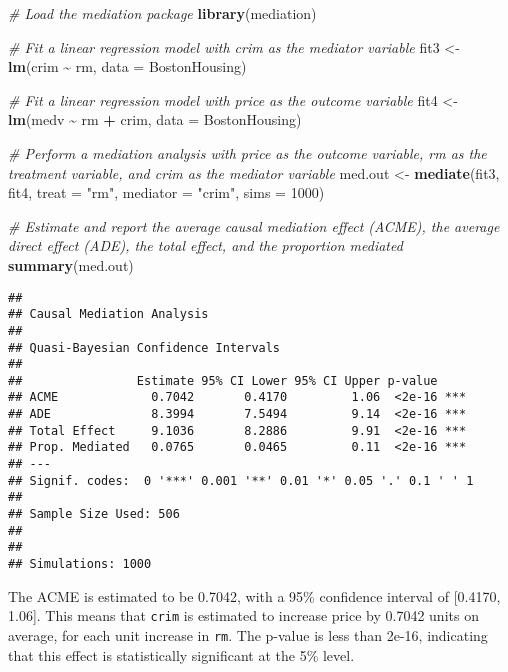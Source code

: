 \documentclass[
]{book}
\newenvironment{Shaded}{\begin{snugshade}}{\end{snugshade}}
\newcommand{\AttributeTok}[1]{\textcolor[rgb]{0.13,0.29,0.53}{#1}}
\newcommand{\CommentTok}[1]{\textcolor[rgb]{0.56,0.35,0.01}{\textit{#1}}}
\newcommand{\DecValTok}[1]{\textcolor[rgb]{0.00,0.00,0.81}{#1}}
\newcommand{\FunctionTok}[1]{\textcolor[rgb]{0.13,0.29,0.53}{\textbf{#1}}}
\newcommand{\NormalTok}[1]{#1}
\newcommand{\OtherTok}[1]{\textcolor[rgb]{0.56,0.35,0.01}{#1}}
\newcommand{\SpecialCharTok}[1]{\textcolor[rgb]{0.81,0.36,0.00}{\textbf{#1}}}
\newcommand{\StringTok}[1]{\textcolor[rgb]{0.31,0.60,0.02}{#1}}
\begin{document}
\begin{Shaded}
\begin{Highlighting}[]
\CommentTok{\# Load the mediation package}
\FunctionTok{library}\NormalTok{(mediation)}

\CommentTok{\# Fit a linear regression model with crim as the mediator variable}
\NormalTok{fit3 }\OtherTok{\textless{}{-}} \FunctionTok{lm}\NormalTok{(crim }\SpecialCharTok{\textasciitilde{}}\NormalTok{ rm, }\AttributeTok{data =}\NormalTok{ BostonHousing)}

\CommentTok{\# Fit a linear regression model with price as the outcome variable}
\NormalTok{fit4 }\OtherTok{\textless{}{-}} \FunctionTok{lm}\NormalTok{(medv }\SpecialCharTok{\textasciitilde{}}\NormalTok{ rm }\SpecialCharTok{+}\NormalTok{ crim, }\AttributeTok{data =}\NormalTok{ BostonHousing)}

\CommentTok{\# Perform a mediation analysis with price as the outcome variable, rm as the treatment variable, and crim as the mediator variable}
\NormalTok{med.out }\OtherTok{\textless{}{-}} \FunctionTok{mediate}\NormalTok{(fit3, fit4, }\AttributeTok{treat =} \StringTok{"rm"}\NormalTok{, }\AttributeTok{mediator =} \StringTok{"crim"}\NormalTok{, }\AttributeTok{sims =} \DecValTok{1000}\NormalTok{)}

\CommentTok{\# Estimate and report the average causal mediation effect (ACME), the average direct effect (ADE), the total effect, and the proportion mediated}
\FunctionTok{summary}\NormalTok{(med.out)}
\end{Highlighting}
\end{Shaded}

\begin{verbatim}
## 
## Causal Mediation Analysis 
## 
## Quasi-Bayesian Confidence Intervals
## 
##                Estimate 95% CI Lower 95% CI Upper p-value    
## ACME             0.7042       0.4170         1.06  <2e-16 ***
## ADE              8.3994       7.5494         9.14  <2e-16 ***
## Total Effect     9.1036       8.2886         9.91  <2e-16 ***
## Prop. Mediated   0.0765       0.0465         0.11  <2e-16 ***
## ---
## Signif. codes:  0 '***' 0.001 '**' 0.01 '*' 0.05 '.' 0.1 ' ' 1
## 
## Sample Size Used: 506 
## 
## 
## Simulations: 1000
\end{verbatim}

The ACME is estimated to be 0.7042, with a 95\% confidence interval of {[}0.4170, 1.06{]}. This means that \texttt{crim} is estimated to increase price by 0.7042 units on average, for each unit increase in \texttt{rm}. The p-value is less than 2e-16, indicating that this effect is statistically significant at the 5\% level.
\end{document}
